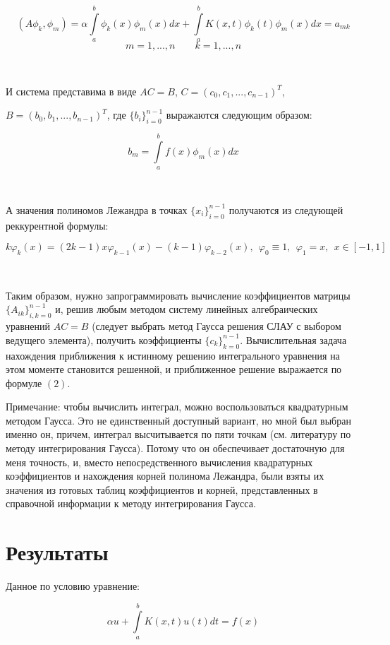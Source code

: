 \documentclass[12pt,a4paper]{article}
\begin{document}
$$(A\phi_k, \phi_m) = \alpha \int\limits_a^b \phi_k(x)\phi_m(x)dx + \int\limits_a^b K(x,t) \phi_k(t) \phi_m(x)dx = a_{mk}$$
$$ m = 1, ..., n \qquad k = 1, ... , n $$

\

И система представима в виде $ AC = B $, 
$ C = \left ( c_0, c_1, ..., c_{n-1} \right )^T$, 

$ B = \left ( b_0, b_1, ..., b_{n-1} \right )^T $, 
где $\{ b_i \}_{i=0}^{n-1}$ выражаются следующим образом:

$$b_m = \int\limits_a^b f(x)\phi_m(x)dx$$ 

\

А значения полиномов Лежандра в точках $\{ x_i \}_{i=0}^{n-1}$ получаются из следующей реккурентной формулы:

\begin{equation}
 k\varphi_k(x) = (2k-1)x \varphi_{k-1}(x) - (k-1) \varphi_{k-2}(x), \ \ 
 \varphi_0 \equiv 1, \ \ \varphi_1 = x, \ \ x \in [-1,1]
\end{equation}

\

Таким образом, нужно запрограммировать вычисление коэффициентов матрицы $\{ A_{ik} \}_{i,k=0}^{n-1}$ и, решив любым методом систему линейных алгебраических уравнений $ AC = B $ (следует выбрать метод Гаусса решения СЛАУ с выбором ведущего элемента), получить коэффициенты $\{ c_k \}_{k=0}^{n-1}$. Вычислительная задача нахождения приближения к истинному решению интегрального уравнения на этом моменте становится решенной, и приближенное решение выражается по формуле $(2)$.

Примечание: чтобы вычислить интеграл, можно воспользоваться квадратурным методом Гаусса. Это не единственный доступный вариант, но мной был выбран именно он, причем, интеграл высчитывается по пяти точкам (см. литературу по методу интегрирования Гаусса). Потому что он обеспечивает достаточную для меня точность, и, вместо непосредственного вычисления квадратурных коэффициентов и нахождения корней полинома Лежандра, были взяты их значения из готовых таблиц коэффициентов и корней, представленных в справочной информации к методу интегрирования Гаусса.


\section{Результаты}

Данное по условию уравнение:


$$ \alpha u + \int\limits_a^b K(x,t) u(t) dt = f(x) $$
\end{document}
